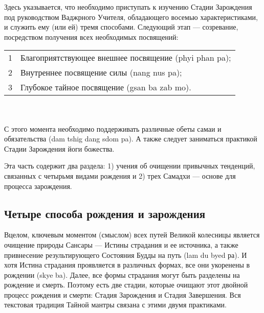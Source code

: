 Здесь указывается, что необходимо приступать к изучению Стадии Зарождения под
руководством Ваджрного Учителя, обладающего восемью характеристиками, и служить ему
(или ей) тремя способами. Следующий этап — созревание, посредством получения всех
необходимых посвящений:\\

\begin{tabular}{ll}
1 & Благоприятствующее внешнее посвящение (phyi phan pa);\\
2 & Внутреннее посвящение силы (nang nus pa);\\
3 & Глубокое тайное посвящение (gsan ba zab mo).\\
\end{tabular}\\
\\
С этого момента необходимо поддерживать различные обеты самаи и обязательства
(dam tshig dang sdom pa). А также следует заниматься практикой Стадии Зарождения йоги
божества.\\

\begin{siderules}
Эта часть содержит два раздела: 1) учения об очищении привычных тенденций, связанных с четырьмя видами рождения и
2) трех Самадхи — основе для процесса зарождения.
\end{siderules}

\subsection{Четыре способа рождения и зарождения}

\begin{siderules}
Вцелом, ключевым моментом (смыслом) всех путей Великой колесницы является очищение
природы Сансары — Истины страдания и ее источника, а также привнесение
результирующего Состояния Будды на путь (lam du byed ра). И хотя Истина страдания
проявляется в различных формах, все они укоренены в рождении (skye ba).
Далее, все формы страдания могут быть разделены на рождение и смерть.
Поэтому есть две стадии, которые очищают этот двойной процесс рождения и смерти:
Стадия Зарождения и Стадия Завершения. Вся текстовая традиция Тайной мантры
связана с этими двумя практиками.
\end{siderules}


